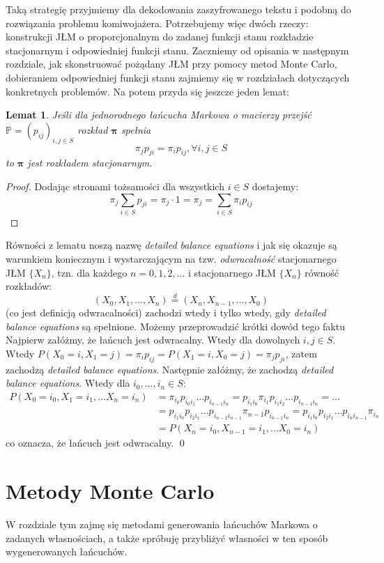 \documentclass[a4paper]{article}
\theoremstyle{defn}
\theoremstyle{theorem}
\theoremstyle{lemma}
\newtheorem{lemma}[defn]{Lemat}
\theoremstyle{cor}
\theoremstyle{fact}
\begin{document}
Taką strategię przyjmiemy dla dekodowania zaszyfrowanego tekstu i podobną do rozwiązania problemu komiwojażera.
Potrzebujemy więc dwóch rzeczy: konstrukcji JŁM o proporcjonalnym do zadanej funkcji stanu rozkładzie stacjonarnym i odpowiedniej funkcji stanu. Zaczniemy od opisania w następnym rozdziale, jak skonstruować pożądany JŁM przy pomocy metod Monte Carlo, dobieraniem odpowiedniej funkcji stanu zajmiemy się w rozdziałach dotyczących konkretnych problemów. Na potem przyda się jeszcze jeden lemat:
\begin{lemma}\label{lemma2.7.1}
Jeśli dla jednorodnego łańcucha Markowa o macierzy przejść $\mathbb{P} = (p_{ij})_{i, j \in S}$ rozkład $\boldsymbol{\pi}$ spełnia $$\pi_j p_{ji} = \pi_i p_{ij},  \forall i,j \in S$$ to $\boldsymbol{\pi}$ jest rozkładem stacjonarnym.
\end{lemma}
\begin{proof} Dodając stronami  tożsamości dla wszystkich $i \in S$ dostajemy:
$$\pi_j \sum\limits_{i \in S} p_{ji} = \pi_j \cdot 1 = \pi_j = \sum\limits_{i \in S} \pi_i p_{ij}$$
\end{proof}
Równości z lematu noszą nazwę \textit{detailed balance equations} i jak się okazuje są warunkiem koniecznym i wystarczającym na tzw. \textit{odwracalność} stacjonarnego JŁM $\{X_n\}$, tzn. dla każdego $n = 0,1,2,...$ i stacjonarnego JŁM $\{X_n\}$ równość rozkładów:
$$(X_0, X_1, ..., X_n) \overset{d}{=} (X_n, X_{n-1}, ..., X_0)$$
(co jest definicją odwracalności) zachodzi wtedy i tylko wtedy, gdy \textit{detailed balance equations} są spełnione.
Możemy przeprowadzić krótki dowód tego faktu
Najpierw załóżmy, że łańcuch jest odwracalny. Wtedy dla dowolnych $i,j \in S$. Wtedy $P(X_0 = i, X_1 = j) = \pi_i p_{ij} = P(X_1 = i, X_0 = j) = \pi_j p_{ji}$, zatem zachodzą \textit{detailed balance equations}. Następnie załóżmy, że zachodzą \textit{detailed balance equations}. Wtedy dla $i_0, ..., i_n \in S$:
\begin{align*}
P(X_0 = i_0, X_1 = i_1, ... X_n = i_n) &= \pi_{i_0} p_{i_0 i_1} ... p_{i_{n-1} i_n} =
p_{i_1 i_0} \pi_{i_1}  p_{i_1 i_2} ... p_{i_{n-1} i_n} = ... \\ &=p_{i_1 i_0} p_{i_2 i_1} ... p_{i_{n-2} i_{n-1}} \pi_{n-1} p_{i_{n-1} i_n} = p_{i_1 i_0} p_{i_2 i_1} ... p_{i_{n} i_{n-1}} \pi_{i_n} \\
&=P(X_n = i_0, X_{n-1} = i_1, ... X_0 = i_n)
\end{align*}
co oznacza, że łańcuch jest odwracalny. \qed
\newpage
\section{Metody Monte Carlo}
W rozdziale tym zajmę się metodami generowania łańcuchów Markowa o zadanych własnościach, a także spróbuję przybliżyć własności w ten sposób wygenerowanych łańcuchów.
\\
\end{document}
